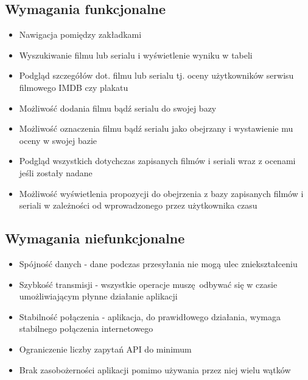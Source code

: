 \documentclass[12pt,oneside,a4paper]{report}
\begin{document}
\subsection{Wymagania funkcjonalne}
\begin{itemize}
	\item Nawigacja pomiędzy zakładkami
	\item Wyszukiwanie filmu lub serialu i wyświetlenie wyniku w tabeli
	\item Podgląd szczegółów dot. filmu lub serialu tj. oceny użytkowników serwisu filmowego IMDB czy plakatu
	\item Możliwość dodania filmu bądź serialu do swojej bazy
	\item Możliwość oznaczenia filmu bądź serialu jako obejrzany i wystawienie mu oceny w swojej bazie
	\item Podgląd wszystkich dotychczas zapisanych filmów i seriali wraz z ocenami jeśli zostały nadane
	\item Możliwość wyświetlenia propozycji do obejrzenia z bazy zapisanych filmów i seriali w zależności od wprowadzonego przez użytkownika czasu 
\end{itemize}

\subsection{Wymagania niefunkcjonalne}
\begin{itemize}
	\item Spójność danych - dane podczas przesyłania nie mogą ulec zniekształceniu
	\item Szybkość transmisji - wszystkie operacje muszę odbywać się w czasie umożliwiającym płynne działanie aplikacji
	\item Stabilność połączenia - aplikacja, do prawidłowego działania, wymaga stabilnego połączenia internetowego 
	\item Ograniczenie liczby zapytań API do minimum
	\item Brak zasobożerności aplikacji pomimo używania przez niej wielu wątków 
\end{itemize}
\end{document}
